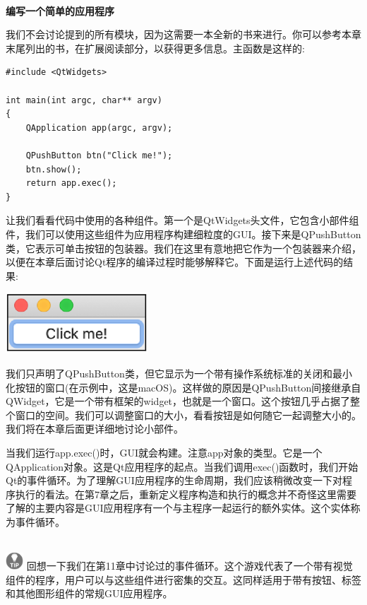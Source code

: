 \noindent\textbf{}\ \par
\textbf{编写一个简单的应用程序} \ \par
我们不会讨论提到的所有模块，因为这需要一本全新的书来进行。你可以参考本章末尾列出的书，在扩展阅读部分，以获得更多信息。主函数是这样的: \par

\begin{lstlisting}[caption={}]
#include <QtWidgets>

int main(int argc, char** argv)
{
	QApplication app(argc, argv);
	
	QPushButton btn("Click me!");
	btn.show();
	return app.exec();
}
\end{lstlisting}

让我们看看代码中使用的各种组件。第一个是QtWidgets头文件，它包含小部件组件，我们可以使用这些组件为应用程序构建细粒度的GUI。接下来是QPushButton类，它表示可单击按钮的包装器。我们在这里有意地把它作为一个包装器来介绍，以便在本章后面讨论Qt程序的编译过程时能够解释它。下面是运行上述代码的结果: \par

\begin{center}
	\includegraphics[width=0.4\textwidth]{content/Section-2/Chapter-14/5}
\end{center}

我们只声明了QPushButton类，但它显示为一个带有操作系统标准的关闭和最小化按钮的窗口(在示例中，这是macOS)。这样做的原因是QPushButton间接继承自QWidget，它是一个带有框架的widget，也就是一个窗口。这个按钮几乎占据了整个窗口的空间。我们可以调整窗口的大小，看看按钮是如何随它一起调整大小的。我们将在本章后面更详细地讨论小部件。 \par
当我们运行app.exec()时，GUI就会构建。注意app对象的类型。它是一个QApplication对象。这是Qt应用程序的起点。当我们调用exec()函数时，我们开始Qt的事件循环。为了理解GUI应用程序的生命周期，我们应该稍微改变一下对程序执行的看法。在第7章之后，重新定义程序构造和执行的概念并不奇怪这里需要了解的主要内容是GUI应用程序有一个与主程序一起运行的额外实体。这个实体称为事件循环。 \par

\hspace*{\fill} \\ %
\includegraphics[width=0.05\textwidth]{images/tip}
回想一下我们在第11章中讨论过的事件循环。这个游戏代表了一个带有视觉组件的程序，用户可以与这些组件进行密集的交互。这同样适用于带有按钮、标签和其他图形组件的常规GUI应用程序。 \par
\noindent\textbf{}\ \par

